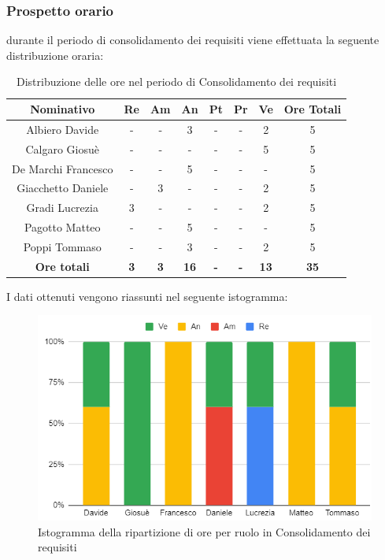 \subsubsection{Prospetto orario}
durante il periodo di consolidamento dei requisiti viene effettuata la seguente distribuzione oraria:
\begin{table}[H]
		\begin{center}
			\setlength{\aboverulesep}{0pt}
			\setlength{\belowrulesep}{0pt}
			\setlength{\extrarowheight}{.75ex}
			\begin{tabular}{ c c c c c c c c }
				\rowcolor{AzzurroGruppo!30} 
				\textbf{Nominativo} & \textbf{Re} & \textbf{Am} & \textbf{An} & \textbf{Pt} & \textbf{Pr} & \textbf{Ve} & \textbf{Ore Totali}  \\
				\toprule
				Albiero Davide      & - & - & 3 & - & - & 2 & 5 \\
				Calgaro Giosuè      & - & - & - & - & - & 5 & 5 \\
				De Marchi Francesco & - & - & 5 & - & - & - & 5\\
				Giacchetto Daniele  & - & 3 & - & - & - & 2 & 5\\
				Gradi Lucrezia      & 3 & - & - & - & - & 2 & 5\\
				Pagotto Matteo      & - & - & 5 & - & - & - & 5\\
				Poppi Tommaso       & - & - & 3 & - & - & 2 & 5\\
				 \textbf{Ore totali} & \textbf{3} & \textbf{3} & \textbf{16} & \textbf{-} & \textbf{-} & \textbf{13} & \textbf{35} \\
				\bottomrule
			\end{tabular}
			\caption{Distribuzione delle ore nel periodo di Consolidamento dei requisiti}
		\end{center}
	\end{table}
I dati ottenuti vengono riassunti nel seguente istogramma:
\begin{figure}[H]
    \centering
    \includegraphics[scale = 0.5]{components/img/consolidamento_isto.png}
    \caption{Istogramma della ripartizione di ore per ruolo in Consolidamento dei requisiti}
    \label{fig:logo}
\end{figure}
